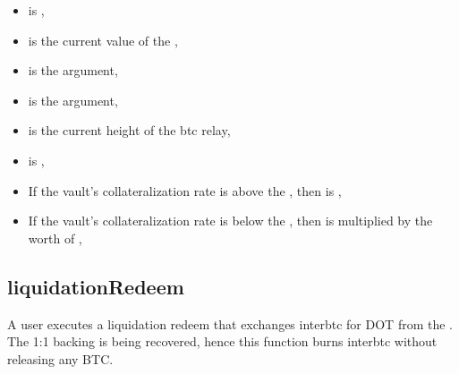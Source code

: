 \documentclass[a4paper,10pt,english]{sphinxmanual}
\begin{document}
\begin{itemize}
\begin{description}
\begin{itemize}
\item {} 
 is ,

\item {} 
 is the current value of the {\hyperref[\detokenize{spec/redeem:redeemperiod}]{}},

\item {} 
 is the  argument,

\item {} 
 is the  argument,

\item {} 
 is the current height of the btc relay,

\item {} 
 is ,

\item {} 
If the vault’s collateralization rate is above the {\hyperref[\detokenize{spec/vault-registry:premiumcollateralthreshold}]{}}, then  is ,

\item {} 
If the vault’s collateralization rate is below the {\hyperref[\detokenize{spec/vault-registry:premiumcollateralthreshold}]{}}, then  is {\hyperref[\detokenize{spec/fee:premiumredeemfee}]{}} multiplied by the worth of ,

\end{itemize}

\end{description}

\end{itemize}


\subsection{liquidationRedeem}
\label{\detokenize{spec/redeem:liquidationredeem}}\label{\detokenize{spec/redeem:id6}}
A user executes a liquidation redeem that exchanges interbtc for DOT from the . The 1:1 backing is being recovered, hence this function burns interbtc without releasing any BTC.
\end{document}

